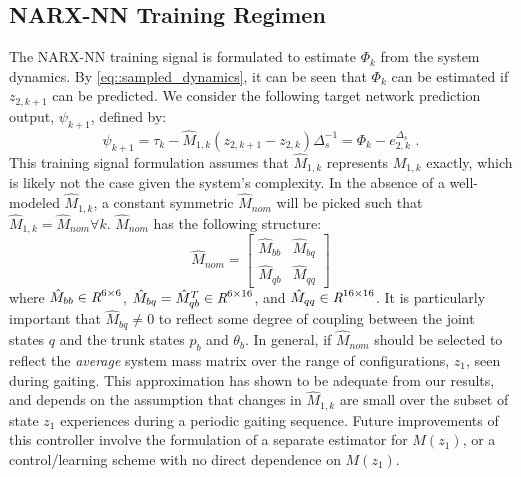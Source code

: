 		\subsection{NARX-NN Training Regimen}
			
			The  NARX-NN training signal is formulated to estimate $\Phi_{k}$ from the system dynamics. By \ref{eq::sampled_dynamics}, it can be seen that $\Phi_{k}$ can be estimated if ${z}_{2,k+1}$ can be predicted. We consider the following target network prediction output, $\psi_{k+1}$,  defined by:
				\begin{equation}
					\psi_{k+1} = \tau_{k} - \hat{M}_{1,k}({z}_{2,k+1} - {z}_{2,k})\Delta_{s}^{-1} = \Phi_{k} - {e}_{2,k}^{\Delta_{s}} \text{ .}
					\label{eq::training_signal}
				\end{equation}
			This training signal formulation assumes that $\hat{M}_{1,k}$ represents $M_{1,k}$ exactly, which is likely not the case given the system's complexity. In the absence of a well-modeled $\hat{M}_{1,k}$, a constant symmetric $\hat{M}_{nom}$ will be picked such that $\hat{M}_{1,k} = \hat{M}_{nom} \forall k$. $\hat{M}_{nom}$ has the following structure:
				\begin{equation}
					\hat{M}_{nom} = \left[
						\begin{array}{cc}
						\hat{M}_{bb}	&	 \hat{M}_{bq}\\
						\hat{M}_{qb}	&	 \hat{M}_{qq}
						\end{array}
					\right]
				\end{equation}
			where 	$\hat{M}_{bb}\in \emph{R}^{6\times6}$, 
					$\hat{M}_{bq}=\hat{M}_{qb}^{T} \in \emph{R}^{6\times16}$, and  
					$\hat{M}_{qq}\in \emph{R}^{16\times16}$. 
			It is particularly important that $\hat{M}_{bq}\neq0$ to reflect some degree of coupling between the joint states $q$ and the trunk states ${p}_{b}$ and $\theta_{b}$. In general, if $\hat{M}_{nom}$ should be selected to reflect the \emph{average} system mass matrix over the range of configurations, $z_{1}$, seen during gaiting. This approximation has shown to be adequate from our results, and depends on the assumption that changes in $\hat{M}_{1,k}$ are small  over the subset of state $z_{1}$ experiences during a periodic gaiting sequence. Future improvements of this controller involve the formulation of a separate estimator for $M(z_{1})$, or a control/learning scheme with no direct dependence on $M(z_{1})$.

